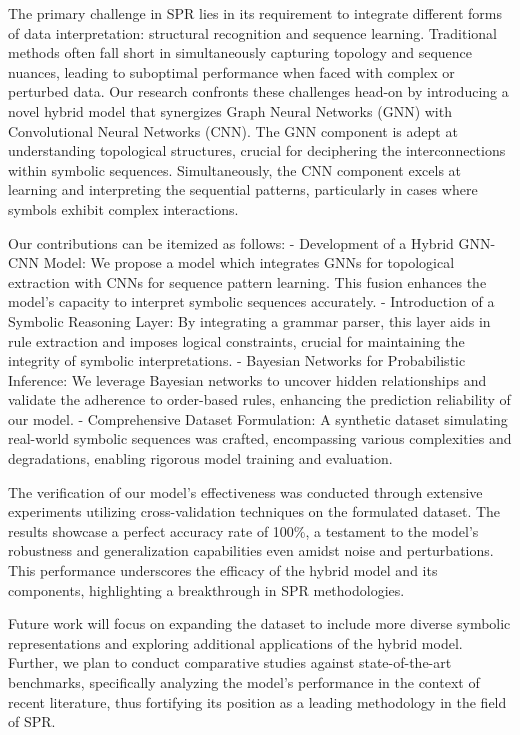 \documentclass{article}
\begin{document}
The primary challenge in SPR lies in its requirement to integrate different forms of data interpretation: structural recognition and sequence learning. Traditional methods often fall short in simultaneously capturing topology and sequence nuances, leading to suboptimal performance when faced with complex or perturbed data. Our research confronts these challenges head-on by introducing a novel hybrid model that synergizes Graph Neural Networks (GNN) with Convolutional Neural Networks (CNN). The GNN component is adept at understanding topological structures, crucial for deciphering the interconnections within symbolic sequences. Simultaneously, the CNN component excels at learning and interpreting the sequential patterns, particularly in cases where symbols exhibit complex interactions.

Our contributions can be itemized as follows:
- Development of a Hybrid GNN-CNN Model: We propose a model which integrates GNNs for topological extraction with CNNs for sequence pattern learning. This fusion enhances the model's capacity to interpret symbolic sequences accurately.
- Introduction of a Symbolic Reasoning Layer: By integrating a grammar parser, this layer aids in rule extraction and imposes logical constraints, crucial for maintaining the integrity of symbolic interpretations.
- Bayesian Networks for Probabilistic Inference: We leverage Bayesian networks to uncover hidden relationships and validate the adherence to order-based rules, enhancing the prediction reliability of our model.
- Comprehensive Dataset Formulation: A synthetic dataset simulating real-world symbolic sequences was crafted, encompassing various complexities and degradations, enabling rigorous model training and evaluation.

The verification of our model's effectiveness was conducted through extensive experiments utilizing cross-validation techniques on the formulated dataset. The results showcase a perfect accuracy rate of 100\%, a testament to the model's robustness and generalization capabilities even amidst noise and perturbations. This performance underscores the efficacy of the hybrid model and its components, highlighting a breakthrough in SPR methodologies.

Future work will focus on expanding the dataset to include more diverse symbolic representations and exploring additional applications of the hybrid model. Further, we plan to conduct comparative studies against state-of-the-art benchmarks, specifically analyzing the model's performance in the context of recent literature, thus fortifying its position as a leading methodology in the field of SPR.
\end{document}
